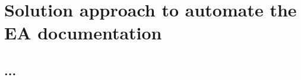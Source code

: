 \chapter{Solution approach to automate the EA documentation}\label{chapter:evaluation}

\section{...}